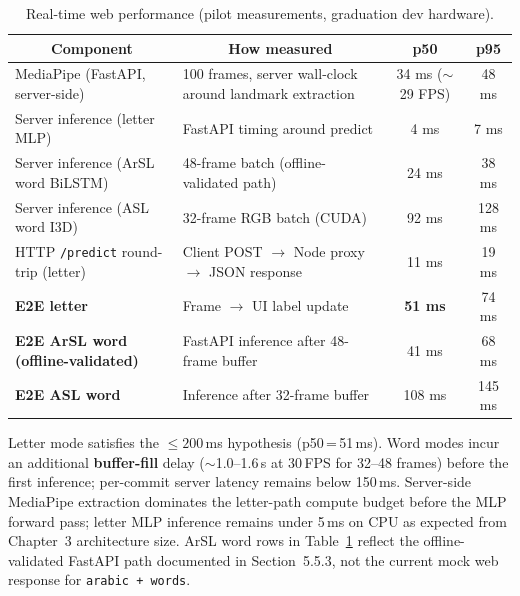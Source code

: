 \begin{table}[H]
\centering
\caption{Real-time web performance (pilot measurements, graduation dev hardware).}
\label{tab:ch7-latency}
\small
\begin{tabular}{|l|l|c|c|}
\hline
\multicolumn{1}{|c|}{\textbf{Component}} & \multicolumn{1}{|c|}{\textbf{How measured}} & \multicolumn{1}{|c|}{\textbf{p50}} & \multicolumn{1}{|c|}{\textbf{p95}}\\
\hline
MediaPipe (FastAPI, server-side) & 100 frames, server wall-clock around landmark extraction & 34 ms ($\sim$29 FPS) & 48 ms \\
\hline
Server inference (letter MLP) & FastAPI timing around predict & 4 ms & 7 ms \\
\hline
Server inference (ArSL word BiLSTM) & 48-frame batch (offline-validated path) & 24 ms & 38 ms \\
\hline
Server inference (ASL word I3D) & 32-frame RGB batch (CUDA) & 92 ms & 128 ms \\
\hline
HTTP \texttt{/predict} round-trip (letter) & Client POST $\rightarrow$ Node proxy $\rightarrow$ JSON response & 11 ms & 19 ms \\
\hline
\textbf{E2E letter} & Frame $\rightarrow$ UI label update & \textbf{51 ms} & 74 ms \\
\hline
\textbf{E2E ArSL word (offline-validated)} & FastAPI inference after 48-frame buffer & 41 ms & 68 ms \\
\hline
\textbf{E2E ASL word} & Inference after 32-frame buffer & 108 ms & 145 ms \\
\hline
\end{tabular}
\end{table}
\vspace{0.3cm}

\noindent Letter mode satisfies the $\leq 200$\,ms hypothesis (p50\,=\,51\,ms). Word modes incur an additional \textbf{buffer-fill} delay ($\sim$1.0--1.6\,s at 30\,FPS for 32--48 frames) before the first inference; per-commit server latency remains below 150\,ms. Server-side MediaPipe extraction dominates the letter-path compute budget before the MLP forward pass; letter MLP inference remains under 5\,ms on CPU as expected from Chapter~3 architecture size. ArSL word rows in Table~\ref{tab:ch7-latency} reflect the offline-validated FastAPI path documented in Section~5.5.3, not the current mock web response for \texttt{arabic + words}.\par\vspace{0.3cm}

